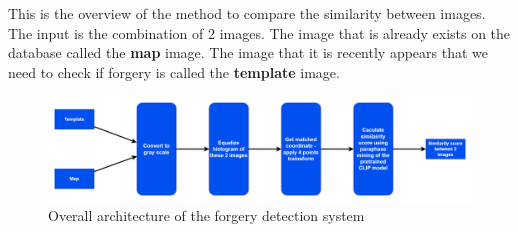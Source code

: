 This is the overview of the method to compare the similarity between images. The input is the combination of 2 images. The image that is already exists on the database called the \textbf{map} image. The image that it is recently appears that we need to check if forgery is called the \textbf{template} image.

\begin{figure}[H]
    \centering
    \includegraphics[width=1\textwidth]{images/pm_describe.drawio.png}
    \caption{Overall architecture of the forgery detection system}
    \label{fig:altice_campus}
\end{figure}

